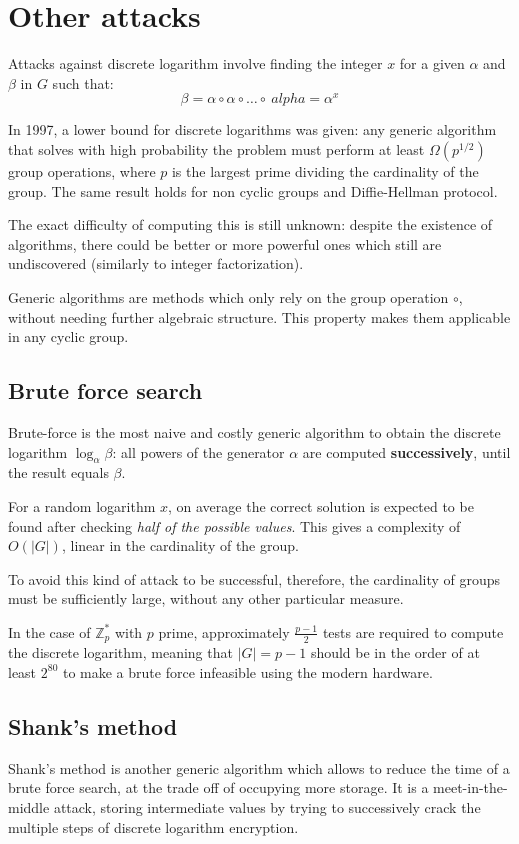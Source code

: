 \section{Other attacks}
Attacks against discrete logarithm involve finding the integer $x$ for a given $\alpha$ and $\beta$ in $G$ such that:
$$\beta = \alpha \circ \alpha \circ \dots \circ \ alpha = \alpha^x$$

In 1997, a lower bound for discrete logarithms was given: any generic algorithm that solves with high probability the problem must perform at least $\Omega(p^{1/2})$ group operations, where $p$ is the largest prime dividing the cardinality of the group. The same result holds for non cyclic groups and Diffie-Hellman protocol.

The exact difficulty of computing this is still unknown: despite the existence of algorithms, there could be better or more powerful ones which still are undiscovered (similarly to integer factorization). 

Generic algorithms are methods which only rely on the group operation $\circ$, without needing further algebraic structure. This property makes them applicable in any cyclic group.

\subsection{Brute force search}
Brute-force is the most naive and costly generic algorithm to obtain the discrete logarithm $\log_\alpha\beta$: all powers of the generator $\alpha$ are computed \textbf{successively}, until the result equals $\beta$.

For a random logarithm $x$, on average the correct solution is expected to be found after checking \textit{half of the possible values}. This gives a complexity of $O(|G|)$, linear in the cardinality of the group.

To avoid this kind of attack to be successful, therefore, the cardinality of groups must be sufficiently large, without any other particular measure. 

In the case of $\mathbb{Z}^*_p$ with $p$ prime, approximately $\frac{p-1}{2}$ tests are required to compute the discrete logarithm, meaning that $|G| = p - 1$ should be in the order of at least $2^{80}$ to make a brute force infeasible using the modern hardware.

\subsection{Shank's method}
Shank's method is another generic algorithm which allows to reduce the time of a brute force search, at the trade off of occupying more storage. It is a meet-in-the-middle attack, storing intermediate values by trying to successively crack the multiple steps of discrete logarithm encryption.

